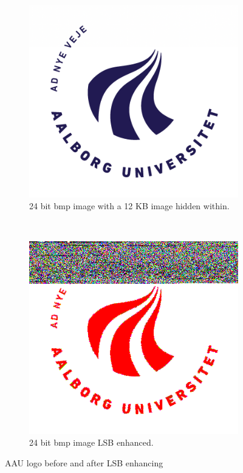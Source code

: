 \begin{figure}
    \centering
    \begin{subfigure}[b]{0.45\textwidth}
		\includegraphics[width=\textwidth]{figures/StegoAAU.png}
		\caption{24 bit bmp image with a 12 KB image hidden within. \citep{imgAAULogo}}
		\label{fig:hiddenAAU}
	\end{subfigure}
	~
	\begin{subfigure}[b]{0.45\textwidth}
		\includegraphics[width=\textwidth]{figures/StegoAAULSB.png}
		\caption{24 bit bmp image LSB enhanced.}
		\label{fig:LSBenhanced}
	\end{subfigure}
	\caption{AAU logo before and after LSB enhancing}
\end{figure}

